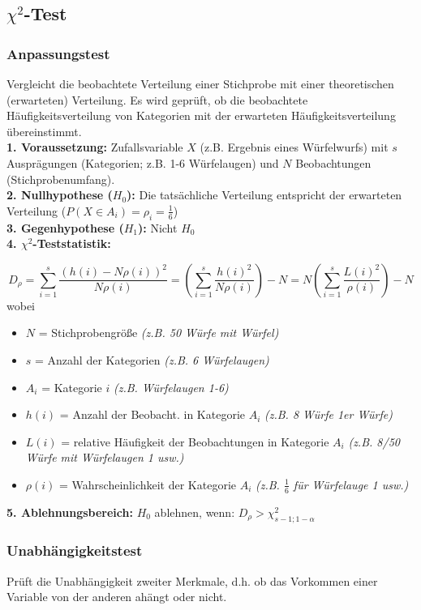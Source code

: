 \subsection{\(\chi^2\)-Test}

\subsubsection{Anpassungstest}

Vergleicht die beobachtete Verteilung einer Stichprobe mit 
einer theoretischen (erwarteten) Verteilung. Es wird geprüft, 
ob die beobachtete Häufigkeitsverteilung von Kategorien mit der 
erwarteten Häufigkeitsverteilung übereinstimmt.\\

\textbf{1. Voraussetzung:} Zufallsvariable \(X\) (z.B. Ergebnis eines Würfelwurfs) mit \(s\) Ausprägungen 
(Kategorien; z.B. 1-6 Würfelaugen) und \(N\) Beobachtungen (Stichprobenumfang).\\

\textbf{2. Nullhypothese (\(H_0\)):} Die tatsächliche Verteilung entspricht der erwarteten Verteilung (\(P(X \in A_i)=\rho_i=\frac{1}{6}\))\\

\textbf{3. Gegenhypothese (\(H_1\)):} Nicht \(H_0\)\\

\textbf{4. \(\chi^2\)-Teststatistik:}

\begin{equation*}
    D_{\rho} = \sum_{i=1}^{s}\frac{(h(i)-N\rho(i))^2}{N\rho(i)}=\left(\sum_{i=1}^{s}\frac{h(i)^2}{N\rho(i)}\right)-N=N\left(\sum_{i=1}^{s}\frac{L(i)^2}{\rho(i)}\right) - N
\end{equation*}
wobei
\begin{itemize}
    \item \(N\) = Stichprobengröße \emph{(z.B. 50 Würfe mit Würfel)}
    \item \(s\) = Anzahl der Kategorien \emph{(z.B. 6 Würfelaugen)}
    \item \(A_i\) = Kategorie \(i\) \emph{(z.B. Würfelaugen 1-6)}
    \item \(h(i)\) = Anzahl der Beobacht. in Kategorie \(A_i\) \emph{(z.B. 8 Würfe 1er Würfe)}
    \item \(L(i)\) = relative Häufigkeit der Beobachtungen in Kategorie \(A_i\) \emph{(z.B. 8/50 Würfe mit Würfelaugen 1 usw.)}
    \item \(\rho(i)\) = Wahrscheinlichkeit der Kategorie \(A_i\) \emph{(z.B. \(\frac{1}{6}\) für Würfelauge 1 usw.)}
\end{itemize}

\textbf{5. Ablehnungsbereich:} \(H_0\) ablehnen, wenn:  \(D_{\rho} > \chi^2_{s-1;1-\alpha}\)\\


\subsubsection{Unabhängigkeitstest}

Prüft die Unabhängigkeit zweiter Merkmale, d.h. ob das Vorkommen einer Variable von der anderen ahängt oder nicht.